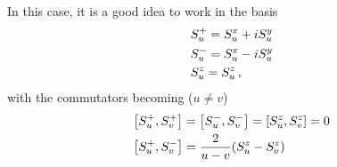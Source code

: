         In this case, it is a good idea to work in the basis
        \begin{align}
            & S^+_u = S^x_u + i S^y_u \\
            & S^-_u = S^x_u - i S^y_u \\
            & S^z_u = S^z_u \thinspace ,
        \end{align}
        with the commutators becoming ($u \neq v$)
        \begin{align}
            & \comm{S^+_u}{S^+_v} = \comm{S^-_u}{S^-_v} = \comm{S^z_u}{S^z_v} = 0 \\
            & \comm{S^+_u}{S^-_v} = \frac{2}{u-v} \qty(S^z_u - S^z_v)
        \end{align}
